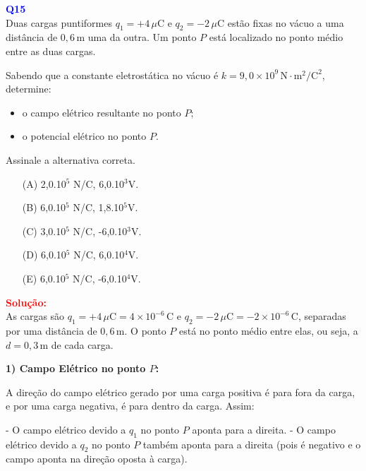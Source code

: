 \documentclass[a4paper,12pt]{article}
\begin{document}
\begin{flushleft}
\textbf{\textcolor{blue}{\Large Q15}}\\
Duas cargas puntiformes \( q_1 = +4\,\mu\text{C} \) e \( q_2 = -2\,\mu\text{C} \) estão fixas no vácuo a uma distância de \( 0{,}6\,\text{m} \) uma da outra. Um ponto \( P \) está localizado no ponto médio entre as duas cargas.

Sabendo que a constante eletrostática no vácuo é \( k = 9{,}0 \times 10^9\,\text{N} \cdot \text{m}^2/\text{C}^2 \), determine:

\begin{itemize}
    \item \colorbox{green!20}{o campo elétrico resultante no ponto \( P \);}
    \item \colorbox{green!20}{o potencial elétrico no ponto \( P \).}
\end{itemize}

Assinale a alternativa correta.
\begin{itemize}
\item[(A)] 2,0.10$^{5}$ N/C, 6,0.10$^{3}$V.
\item[(B)] 6,0.10$^{5}$ N/C, 1,8.10$^{5}$V.
\item[(C)] 3,0.10$^{5}$ N/C, -6,0.10$^{3}$V.
\item[(D)] 6,0.10$^{5}$ N/C, 6,0.10$^{4}$V.
\item[(E)] 6,0.10$^{5}$ N/C, -6,0.10$^{4}$V.
\end{itemize}

\vspace{0.5cm}

\textcolor{red}{\textbf{Solução:}}\\

As cargas são \( q_1 = +4\,\mu\text{C} = 4 \times 10^{-6}\,\text{C} \) e \( q_2 = -2\,\mu\text{C} = -2 \times 10^{-6}\,\text{C} \), 
separadas por uma distância de \( 0{,}6\,\text{m} \). O ponto \( P \) está no ponto médio entre elas, ou seja, a \( d = 0{,}3\,\text{m} \) de cada carga.

\vspace{0.5cm}
\textbf{1) Campo Elétrico no ponto \( P \):}

A direção do campo elétrico gerado por uma carga positiva é para fora da carga, e por uma carga negativa, é para dentro da carga. Assim:

- O campo elétrico devido a \( q_1 \) no ponto \( P \) aponta para a direita.
- O campo elétrico devido a \( q_2 \) no ponto \( P \) também aponta para a direita (pois é negativo e o campo aponta na direção oposta à carga).


\end{flushleft}
\end{document}
